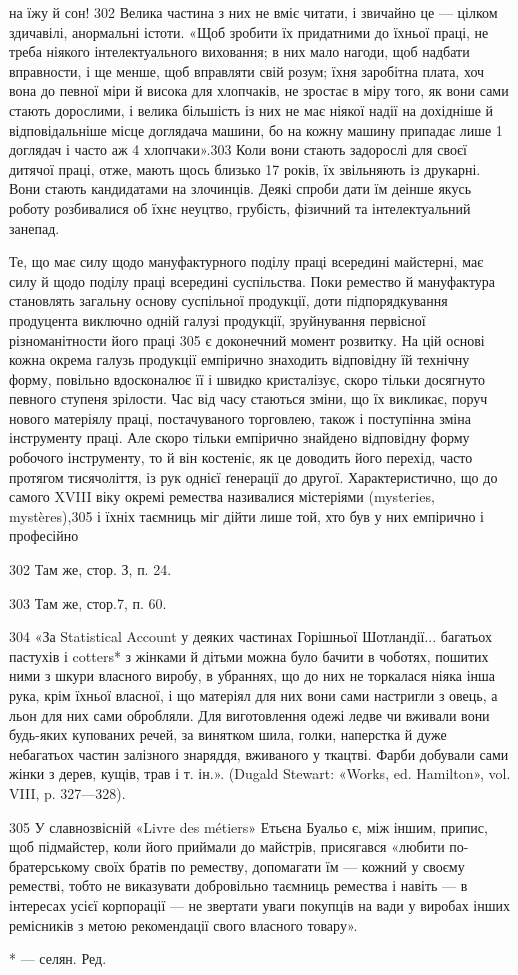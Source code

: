 на їжу й сон! 302 Велика частина з них не вміє читати, і звичайно
це — цілком здичавілі, анормальні істоти. «Щоб зробити їх
придатними до їхньої праці, не треба ніякого інтелектуального
виховання; в них мало нагоди, щоб надбати вправности, і ще
менше, щоб вправляти свій розум; їхня заробітна плата, хоч вона
до певної міри й висока для хлопчаків, не зростає в міру того, як
вони сами стають дорослими, і велика більшість із них не має
ніякої надії на дохідніше й відповідальніше місце доглядача
машини, бо на кожну машину припадає лише 1 доглядач і часто
аж 4 хлопчаки».303 Коли вони стають задорослі для своєї
дитячої праці, отже, мають щось близько 17 років, їх звільняють
із друкарні. Вони стають кандидатами на злочинців. Деякі спроби
дати їм деінше якусь роботу розбивалися об їхнє неуцтво, грубість,
фізичний та інтелектуальний занепад.

Те, що має силу щодо мануфактурного поділу праці всередині
майстерні, має силу й щодо поділу праці всередині суспільства.
Поки ремество й мануфактура становлять загальну основу суспільної
продукції, доти підпорядкування продуцента виключно
одній галузі продукції, зруйнування первісної різноманітности
його праці 305 є доконечний момент розвитку. На цій основі
кожна окрема галузь продукції емпірично знаходить відповідну
їй технічну форму, повільно вдосконалює її і швидко кристалізує,
скоро тільки досягнуто певного ступеня зрілости. Час від
часу стаються зміни, що їх викликає, поруч нового матеріялу
праці, постачуваного торговлею, також і поступінна зміна інструменту
праці. Але скоро тільки емпірично знайдено відповідну
форму робочого інструменту, то й він костеніє, як це доводить
його перехід, часто протягом тисячоліття, із рук однієї ґенерації
до другої. Характеристично, що до самого XVIII віку окремі
ремества називалися містеріями (mysteries, mystères),305 і їхніх
таємниць міг дійти лише той, хто був у них емпірично і професійно

302 Там же, стор. З, п. 24.

303 Там же, стор.7, п. 60.

304 «За Statistical Account у деяких частинах Горішньої Шотландії...
багатьох пастухів і cotters* з жінками й дітьми можна було бачити
в чоботях, пошитих ними з шкури власного виробу, в убраннях, що до
них не торкалася ніяка інша рука, крім їхньої власної, і що матеріял
для них вони сами настригли з овець, а льон для них сами обробляли.
Для виготовлення одежі ледве чи вживали вони будь-яких купованих
речей, за винятком шила, голки, наперстка й дуже небагатьох частин
залізного знаряддя, вживаного у ткацтві. Фарби добували сами жінки з
дерев, кущів, трав і т. ін.». (Dugald Stewart: «Works, ed. Hamilton»,
vol. VIII, p. 327—328).

305    У славнозвісній «Livre des métiers» Етьєна Буальо є, між іншим,
припис, щоб підмайстер, коли його приймали до майстрів, присягався
«любити по-братерському своїх братів по реместву, допомагати їм —
кожний у своєму реместві, тобто не виказувати добровільно таємниць
ремества і навіть — в інтересах усієї корпорації — не звертати уваги
покупців на вади у виробах інших ремісників з метою рекомендації свого
власного товару».

* — селян. Ред.
